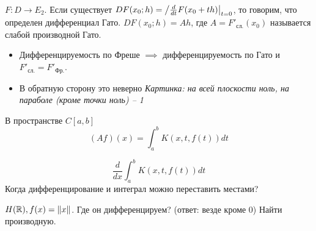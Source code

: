 
\begin{definition}
    $F: D \to E_2$. Если существует $DF(x_0; h) = \left/ \frac{d}{dt} F(x_0 + th) \right|_{t = 0}$, то говорим, что определен дифференциал Гато.
    $DF(x_0; h) = Ah$, где $A = F'_{\text{сл.}}(x_0)$ называется слабой производной Гато.
\end{definition}
\begin{statement}
    \begin{itemize}
        \item[1.] Дифференцируемость по Фреше $\implies$ дифференцируемость по Гато и $F'_{\text{сл.}}=F'_{\text{Фр.}}$.
        \item[2.] В обратную сторону это неверно
        \textit{Картинка: на всей плоскости ноль, на параболе (кроме точки ноль) -- 1}
    \end{itemize}
\end{statement}

\begin{example}
В пространстве $C[a,b]$
\[
(Af)(x) = \int_a^b K(x, t, f(t)) dt
\]

\[
\frac{d}{dx} \int_a^b K(x, t, f(t)) dt
\]
Когда дифференцирование и интеграл можно переставить местами?
\end{example}

\begin{exercise}
    $H(\mathbb{R}), f(x)=\|x\|$. Где он дифференцируем? (ответ: везде кроме 0) Найти производную.
\end{exercise}





